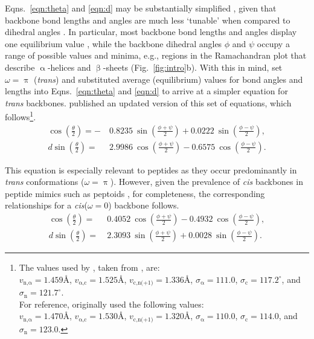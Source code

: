 \documentclass[fleqn,10pt,lineno]{wlpeerj} %
\newcommand{\n}[1]{{\color{black}#1}} %
\newcommand{\Fig}[1]{Fig.~\ref{#1}}
\newcommand{\Eqns}[1]{Eqns.~\ref{#1}}
\newcommand{\cis}{{\em{cis}}\xspace}
\newcommand{\trans}{{\em{trans}}\xspace}
\begin{document}
\Eqns{eqn:theta} and \ref{eqn:d} may be substantially simplified \citep{Miyazawa1961}, given that backbone bond lengths and angles are much less `tunable' when compared to dihedral angles \citep{Ramachandran1963,Improta2015,Esposito2013,Improta2015a}. In particular, most backbone bond lengths and angles display one equilibrium value \citep{Improta2015,Esposito2013,Improta2015a}, while the backbone dihedral angles $\phi$ and $\psi$ occupy a range of possible values and minima, e.g., regions in the Ramachandran plot that describe $\upalpha$-helices and $\upbeta$-sheets (\Fig{fig:intro}b). With this in mind, \cite{Miyazawa1961} set $\omega=\uppi$ (\trans) and substituted average (equilibrium) values for bond angles and lengths into \Eqns{eqn:theta} and \ref{eqn:d} to arrive at a simpler equation for \trans backbones. \cite{Zacharias2013} published an updated version of this set of equations, which follows\footnote{\n{The values used by \cite{Zacharias2013}, taken from \cite{Engh1991,Engh2006}, are:} \\
$v_{\textrm{n,}\upalpha} = 1.459\textrm{\AA}$,\hfill
$v_{\upalpha\textrm{,c}} = 1.525\textrm{\AA}$, \hfill
$v_\textrm{c,n(+1)} = 1.336\textrm{\AA}$, \hfill
$\sigma_\upalpha = 111.0$,\hfill
$\sigma_\textrm{c} = 117.2^\circ$, \hfill and \hfill
$\sigma_\textrm{n} = 121.7^\circ$. \hfill \\
For reference, \cite{Miyazawa1961} originally used the following values:\\ 
$v_{\textrm{n,}\upalpha} = 1.470\textrm{\AA}$,\hfill
$v_{\upalpha\textrm{,c}} = 1.530\textrm{\AA}$,\hfill 
$v_\textrm{c,n(+1)} = 1.320\textrm{\AA}$, \hfill
$\sigma_\upalpha = 110.0$,\hfill
$\sigma_\textrm{c} = 114.0$, \hfill and \hfill
$\sigma_\textrm{n} = 123.0$.}.
\begin{align}
\label{eqn:theta_trans}
\cos\left(\frac{\theta}{2}\right) =-&~0.8235~\sin\left(\frac{\phi+\psi}{2}\right) 
                                    +0.0222~\sin\left(\frac{\phi-\psi}{2}\right),\\
\label{eqn:d_trans}
d \sin\left(\frac{\theta}{2}\right) =&~2.9986~\cos\left(\frac{\phi+\psi}{2}\right)
                                      -0.6575~\cos\left(\frac{\phi-\psi}{2}\right).
\end{align}

This equation is especially relevant to peptides as they occur predominantly in \trans conformations ($\omega=\uppi$). However, given the prevalence of \cis backbones in peptide mimics such as peptoids \citep{Mirijanian2014,Gorske2016}, for completeness, the corresponding relationships for a \cis ($\omega=0$) backbone follows.
\begin{align}
\label{eqn:theta_cis}
\cos\left(\frac{\theta}{2}\right) =&~0.4052~\cos\left(\frac{\phi+\psi}{2}\right)
                                    -0.4932~\cos\left(\frac{\phi-\psi}{2}\right), \\
\label{eqn:d_cis}
d \sin\left(\frac{\theta}{2}\right) = &~2.3093~\sin\left(\frac{\phi+\psi}{2}\right)
                                       +0.0028~\sin\left(\frac{\phi-\psi}{2}\right).
\end{align}
\end{document}
